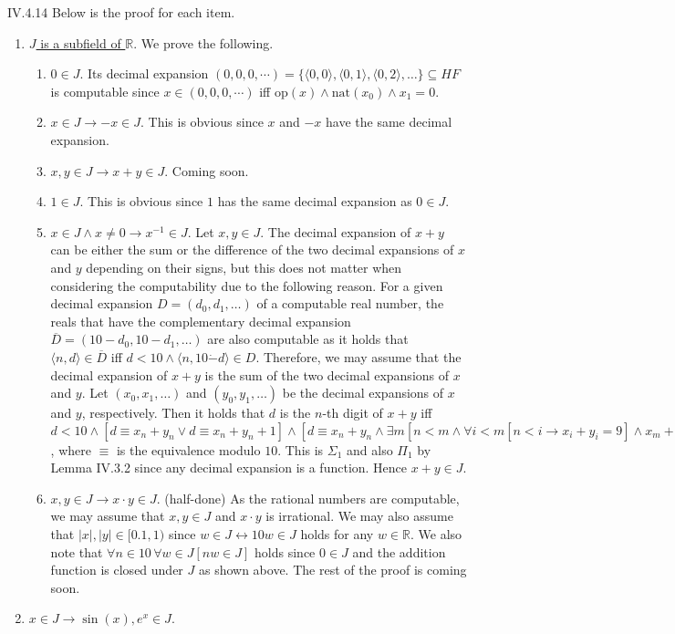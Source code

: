 \documentclass[12pt]{article}
\begin{document}
\begin{customthm}{IV.4.14}
  Below is the proof for each item.
  \begin{enumerate}
    \item\underline{$J$ is a subfield of $\mathbb{R}$}. We prove the following.
    \begin{enumerate}
      \item\underline{$0\in J$}. Its decimal expansion $(0,0,0,\cdots)=\{\langle0,0\rangle,\langle0,1\rangle,\langle0,2\rangle,\ldots\}\subseteq HF$ is computable since $x\in(0,0,0,\cdots)$ iff $\mathrm{op}(x)\wedge\mathrm{nat}(x_0)\wedge x_1=0$.
      \item\underline{$x\in J\rightarrow-x\in J$}. This is obvious since $x$ and $-x$ have the same decimal expansion.
      \item\underline{$x,y\in J\rightarrow x+y\in J$}. Coming soon.
      \item\underline{$1\in J$}. This is obvious since $1$ has the same decimal expansion as $0\in J$.
      \item\underline{$x\in J\wedge x\neq0\rightarrow x^{-1}\in J$}. Let $x,y\in J$. The decimal expansion of $x+y$ can be either the sum or the difference of the two decimal expansions of $x$ and $y$ depending on their signs, but this does not matter when considering the computability due to the following reason. For a given decimal expansion $D=(d_0,d_1,\ldots)$ of a computable real number, the reals that have the complementary decimal expansion $\overline{D}=(10-d_0,10-d_1,\ldots)$ are also computable as it holds that $\langle n,d\rangle\in\overline{D}$ iff $d<10\wedge\langle n,10\dot{-}d\rangle\in D$. Therefore, we may assume that the decimal expansion of $x+y$ is the sum of the two decimal expansions of $x$ and $y$. Let $(x_0,x_1,\ldots)$ and $(y_0,y_1,\ldots)$ be the decimal expansions of $x$ and $y$, respectively. Then it holds that $d$ is the $n$-th digit of $x+y$ iff $d<10\wedge[d\equiv x_n+y_n\vee d\equiv x_n+y_n+1]\wedge[d\equiv x_n+y_n\wedge\exists m[n<m\wedge\forall i<m[n<i\rightarrow x_i+y_i=9]\wedge x_m+y_m<9]]$, where $\equiv$ is the equivalence modulo $10$. This is $\Sigma_1$ and also $\Pi_1$ by Lemma IV.3.2 since any decimal expansion is a function. Hence $x+y\in J$.
      \item\underline{$x,y\in J\rightarrow x\cdot y\in J$}. (half-done) As the rational numbers are computable, we may assume that $x,y\in J$ and $x\cdot y$ is irrational. We may also assume that $|x|,|y|\in[0.1,1)$ since $w\in J\leftrightarrow 10w\in J$ holds for any $w\in\mathbb{R}$. We also note that $\forall n\in10\,\forall w\in J[nw\in J]$ holds since $0\in J$ and the addition function is closed under $J$ as shown above. The rest of the proof is coming soon.
    \end{enumerate}
    \item\underline{$x\in J\rightarrow\sin(x),e^x\in J$}.
  \end{enumerate}
\end{customthm}
\end{document}
